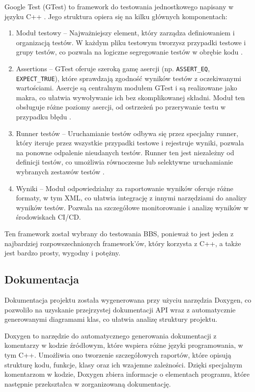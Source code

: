 Google Test (GTest) to framework do testowania jednostkowego napisany w języku C++ \cite{gtest}. Jego struktura opiera się na kilku głównych komponentach:

\begin{enumerate}
    \item Moduł testowy -- Najważniejszy element, który zarządza definiowaniem i organizacją testów. W każdym pliku testowym tworzysz przypadki testowe i grupy testów, co pozwala na logiczne segregowanie testów w obrębie kodu \cite{gtest_primer}.
    \item Assertions -- GTest oferuje szeroką gamę asercji (np. \texttt{ASSERT\_EQ}, \texttt{EXPECT\_TRUE}), które sprawdzają zgodność wyników testów z oczekiwanymi wartościami. Asercje są centralnym modułem GTest i są realizowane jako makra, co ułatwia wywoływanie ich bez skomplikowanej składni. Moduł ten obsługuje różne poziomy asercji, od ostrzeżeń po przerywanie testu w przypadku błędu \cite{gtest_primer}.
    \item Runner testów -- Uruchamianie testów odbywa się przez specjalny runner, który iteruje przez wszystkie przypadki testowe i rejestruje wyniki, pozwala na ponowne odpalenie nieudanych testów. Runner ten jest niezależny od definicji testów, co umożliwia równoczesne lub selektywne uruchamianie wybranych zestawów testów \cite{gtest}. 
    \item Wyniki -- Moduł odpowiedzialny za raportowanie wyników oferuje różne formaty, w tym XML, co ułatwia integrację z innymi narzędziami do analizy wyników testów. Pozwala na szczegółowe monitorowanie i analizę wyników w środowiskach CI/CD.
\end{enumerate}

Ten framework został wybrany do testowania BBS, ponieważ to jest jeden z najbardziej rozpowszechnionych framework'ów, który korzysta z C++, a także jest bardzo prosty, wygodny i potężny.

\subsection{Dokumentacja}
Dokumentacja projektu została wygenerowana przy użyciu narzędzia Doxygen, co pozwoliło na uzyskanie przejrzystej dokumentacji API wraz z automatycznie generowanymi diagramami klas, co ułatwia analizę struktury projektu.

Doxygen to narzędzie do automatycznego generowania dokumentacji z komentarzy w kodzie źródłowym, które wspiera różne języki programowania, w tym C++. Umożliwia ono tworzenie szczegółowych raportów, które opisują strukturę kodu, funkcje, klasy oraz ich wzajemne zależności. Dzięki specjalnym komentarzom w kodzie, Doxygen zbiera informacje o elementach programu, które następnie przekształca w zorganizowaną dokumentację\cite{doxygen,doxygen_features}.

